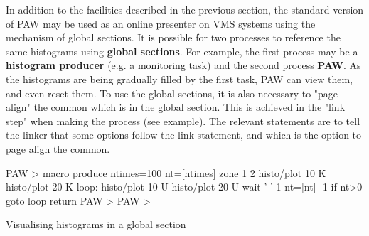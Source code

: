 In addition to the facilities described in the previous section,
the standard version of PAW may be used as an online presenter
on VMS systems using the mechanism of global sections.
It is possible for two processes to reference the same histograms
using {\bf global sections}.
For example, the first process may be a {\bf histogram producer}
(e.g. a monitoring task) and the second process  {\bf PAW}.
As the
histograms are being gradually filled by the first task, PAW can
view them, and even reset them.
To use the global sections, it is also necessary to "page align" the common
which is in the global section. This is achieved in the "link step" when making
the process (see example).
The relevant statements are 
to tell the linker that some options follow the link statement,
and  which is the option to
page align the  common.
 
\begin{minipage}{.42\textwidth}
\end{minipage}\hfill
\begin{minipage}{.56\textwidth}
\begin{XMP}
    PAW > 
       macro produce ntimes=100
         nt=[ntimes]
         zone 1 2
         histo/plot 10 K
         histo/plot 20 K
       loop:
           histo/plot 10 U
           histo/plot 20 U
           wait ' ' 1
           nt=[nt] -1
           if nt>0 goto loop
       return
    PAW > 
    PAW > 
\end{XMP}
\begin{Fighere}
\caption{Visualising histograms in a global section}
\end{Fighere}
\end{minipage}
 

